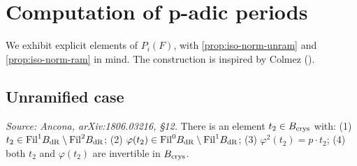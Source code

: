 \section{Computation of p-adic periods}
\label{sec:padic-computation}

We exhibit explicit elements of \(P_i(F)\), with
\cref{prop:iso-norm-unram} and \cref{prop:iso-norm-ram} in mind. The
construction is inspired by Colmez (\cite[\S9]{Colmez}).

\subsection*{Unramified case}

\begin{proposition}
  \label{prop:lubin-tate-unram}
  \textit{Source: Ancona, arXiv:1806.03216, \S12.}
  There is an element \(t_2 \in B_{\mathrm{crys}}\) with:
  (1) \(t_2 \in \mathrm{Fil}^1 B_{\mathrm{dR}} \setminus \mathrm{Fil}^2 B_{\mathrm{dR}}\);
  (2) \(\varphi(t_2) \in \mathrm{Fil}^0 B_{\mathrm{dR}} \setminus \mathrm{Fil}^1 B_{\mathrm{dR}}\);
  (3) \(\varphi^2(t_2) = p \cdot t_2\);
  (4) both \(t_2\) and \(\varphi(t_2)\) are invertible in \(B_{\mathrm{crys}}\).
\end{proposition}

